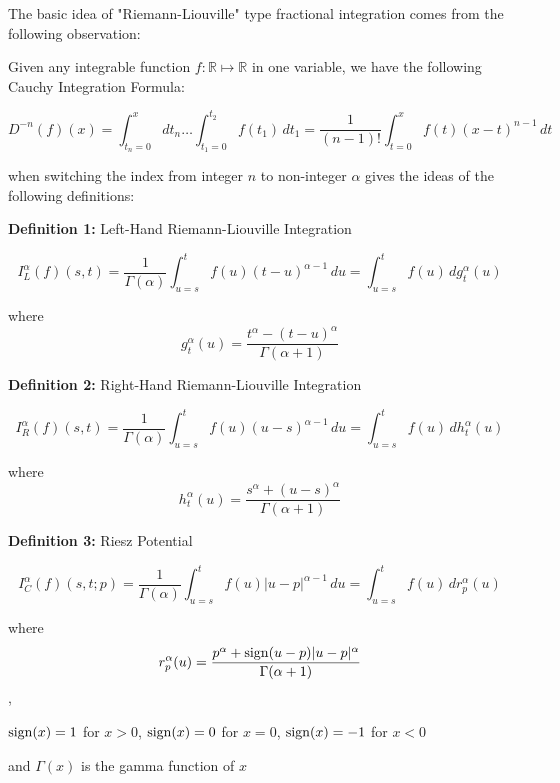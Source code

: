 \documentclass[12pt]{article}
\begin{document}
The basic idea of "Riemann-Liouville" type fractional integration comes from the following observation:

Given any integrable function $f:{\mathbb R}\mapsto {\mathbb R}$ in one variable, we have the following Cauchy Integration Formula:

\begin{displaymath}D^{-n}(f)(x)=\int_{t_n=0}^x dt_n\ldots \int_{t_1=0}^{t_2}
f(t_1)\,dt_1 =\frac{1}{(n-1)!} \int_{t=0}^x f(t)(x-t)^{n-1}\,dt
\end{displaymath}

when switching the index from integer $n$ to non-integer $\alpha$ gives the ideas of the following definitions: 

{\bf Definition 1:}  {\rm Left-Hand Riemann-Liouville Integration}

\begin{displaymath}I^{\alpha}_L (f)(s,t)=
\frac{1}{\Gamma(\alpha)}\int_{u=s}^tf(u)(t-u)^{\alpha-1}\,du
=\int_{u=s}^t f(u)\,dg^{\alpha}_t(u) \end{displaymath}

where \begin{displaymath}g^{\alpha}_t(u)=\frac{t^{\alpha}-(t-u)^{\alpha}}
{\Gamma(\alpha+1)}\end{displaymath}

{\bf Definition 2:}  {\rm Right-Hand Riemann-Liouville Integration}

\begin{displaymath}I^{\alpha}_R (f)(s,t)=
\frac{1}{\Gamma(\alpha)}\int_{u=s}^tf(u)(u-s)^{\alpha-1}\,du
=\int_{u=s}^t f(u)\,dh^{\alpha}_t(u) \end{displaymath}

where \begin{displaymath}h^{\alpha}_t(u)=\frac{s^{\alpha}+(u-s)^{\alpha}}
{\Gamma(\alpha+1)}\end{displaymath}

{\bf Definition 3:}  {\rm Riesz Potential}

\begin{displaymath}I^{\alpha}_C (f)(s,t;p)=
\frac{1}{\Gamma(\alpha)}\int_{u=s}^tf(u)|u-p|^{\alpha-1}\,du
=\int_{u=s}^t f(u)\,dr^{\alpha}_p(u) \end{displaymath}

where \begin{displaymath}r^{\alpha}_p(u)=\frac{p^{\alpha}+{\rm sign}(u-p)
|u-p|^{\alpha}}{\Gamma(\alpha+1)}\end{displaymath},

${\rm sign}(x)=1$ for $x>0$, ${\rm sign}(x)=0$ for $x=0$, ${\rm sign}(x)=-1$ for $x<0$

and $\Gamma(x)$ is the gamma function of $x$
\end{document}
